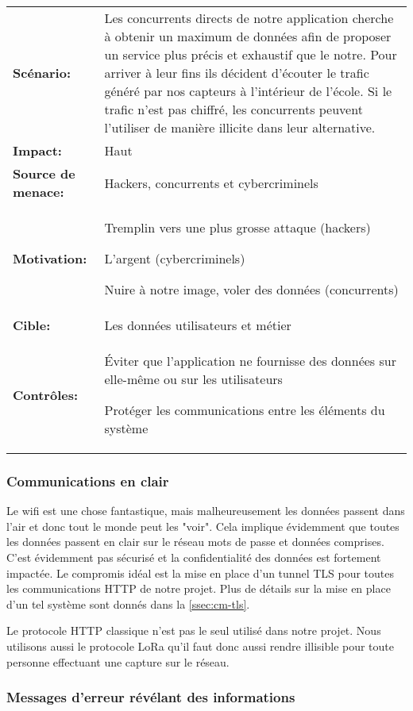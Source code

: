 \renewcommand{\arraystretch}{1.6}
\begin{tabular}{@{}p{4cm}p{12cm}}
\textbf{Scénario:} &  Les concurrents directs de notre application cherche à obtenir un maximum de données afin de proposer un service plus précis et exhaustif que le notre. Pour arriver à leur fins ils décident d'écouter le trafic généré par nos capteurs à l'intérieur de l'école. Si le trafic n'est pas chiffré, les concurrents peuvent l'utiliser de manière illicite dans leur alternative.\\
\textbf{Impact:} & Haut \\
\textbf{Source de menace: } & Hackers, concurrents et cybercriminels \\
\textbf{Motivation:} & Tremplin vers une plus grosse attaque (hackers)

L'argent (cybercriminels)

Nuire à notre image, voler des données (concurrents)\\
\textbf{Cible:} & Les données utilisateurs et métier \\
\textbf{Contrôles:} & Éviter que l'application ne fournisse des données sur elle-même ou sur les utilisateurs

Protéger les communications entre les éléments du système
\end{tabular}
\renewcommand{\arraystretch}{1}

\subsubsection{Communications en clair}

Le wifi est une chose fantastique, mais malheureusement les données passent dans l'air et donc tout le monde peut les "voir". Cela implique évidemment que toutes les données passent en clair sur le réseau mots de passe et données comprises. C'est évidemment pas sécurisé et la confidentialité des données est fortement impactée. Le compromis idéal est la mise en place d'un tunnel TLS pour toutes les communications HTTP de notre projet. Plus de détails sur la mise en place d'un tel système sont donnés dans la \autoref{ssec:cm-tls}.

Le protocole HTTP classique n'est pas le seul utilisé dans notre projet. Nous utilisons aussi le protocole LoRa qu'il faut donc aussi rendre illisible pour toute personne effectuant une capture sur le réseau.

\subsubsection{Messages d'erreur révélant des informations}

